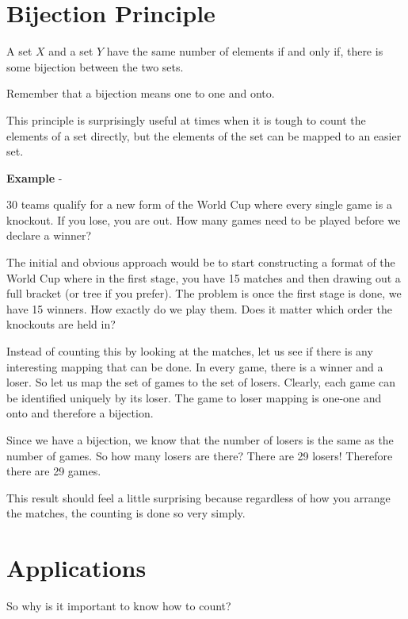 \documentclass[12pt]{article}
\begin{document}
\section*{Bijection Principle}
A set $X$ and a set $Y$ have the same number of elements if and only if, there is some bijection between the two sets. 

Remember that a bijection means one to one and onto. 

This principle is surprisingly useful at times when it is tough to count the elements of a set directly, but the elements of the set can be mapped to an easier set. 

\textbf{Example} - 

30 teams qualify for a new form of the World Cup where every single game is a knockout. If you lose, you are out. How many games need to be played before we declare a winner?

The initial and obvious approach would be to start constructing a format of the World Cup where in the first stage, you have 15 matches and then drawing out a full bracket (or tree if you prefer). The problem is once the first stage is done, we have 15 winners. How exactly do we play them. Does it matter which order the knockouts are held in?

Instead of counting this by looking at the matches, let us see if there is any interesting mapping that can be done. In every game, there is a winner and a loser. So let us map the set of games to the set of losers. Clearly, each game can be identified uniquely by its loser. The game to loser mapping is one-one and onto and therefore a bijection. 

Since we have a bijection, we know that the number of losers is the same as the number of games. So how many losers are there? There are 29 losers! Therefore there are 29 games.

This result should feel a little surprising because regardless of how you arrange the matches, the counting is done so very simply.


\section*{Applications}
So why is it important to know how to count?
\end{document}
